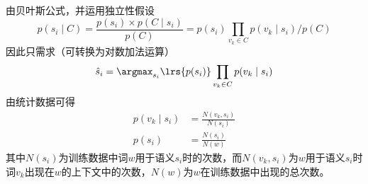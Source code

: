 由贝叶斯公式，并运用独立性假设
\[p(s_i\mid C)=\frac{p(s_i)\times p(C\mid s_i)}{p(C)}=p(s_i)\prod_{v_k\in C}p(v_k\mid s_i)\Big/ p(C)\]
因此只需求（可转换为对数加法运算）
\[\hat{s}_i=\argmax_{s_i}\lrs{p(s_i)}\prod_{v_k\in C}p(v_k\mid s_i)\]
由统计数据可得
\[\begin{aligned}
p(v_k\mid s_i)&=\frac{N(v_k,s_i)}{N(s_i)}\\
p(s_i)&=\frac{N(s_i)}{N(w)}
\end{aligned}\]
其中$N(s_i)$为训练数据中词$w$用于语义$s_i$时的次数，而$N(v_k,s_i)$为$w$用于语义$s_i$时词$v_k$出现在$w$的上下文中的次数，$N(w)$为$w$在训练数据中出现的总次数。